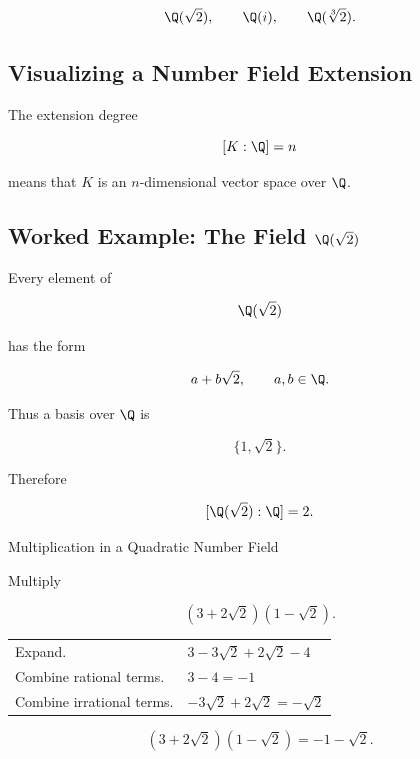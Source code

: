 \[ \Q(\sqrt2),\qquad\Q(i),\qquad\Q(\sqrt[3]{2}). \]

\subsection{Visualizing a Number Field Extension}
\label{subsec:number-field-extension-visual}

\begin{centereddiagram}
\end{centereddiagram}

The extension degree

\[ [K:\Q]=n \]

means that \(K\) is an \(n\)-dimensional vector space over \(\Q\).

\subsection{Worked Example: The Field \(\Q(\sqrt2)\)}
\label{subsec:worked-q-sqrt2}

Every element of

\[ \Q(\sqrt2) \]

has the form

\[ a+b\sqrt2,\qquad a,b\in\Q. \]

Thus a basis over \(\Q\) is

\[ \{1,\sqrt2\}. \]

Therefore

\[ [\Q(\sqrt2):\Q]=2. \]

\begin{workedexamplebox}{Multiplication in a Quadratic Number Field}

Multiply

\[ (3+2\sqrt2)(1-\sqrt2). \]

\begin{tabularx}{\textwidth}{@{}>{\raggedright\arraybackslash}p{}X@{}}
Expand. &
\(3-3\sqrt2+2\sqrt2-4\)\\
Combine rational terms. &
\(3-4=-1\)\\
Combine irrational terms. &
\(-3\sqrt2+2\sqrt2=-\sqrt2\)
\end{tabularx}

\begin{answerbox}
\[ \boxed{(3+2\sqrt2)(1-\sqrt2)=-1-\sqrt2.} \]
\end{answerbox}
\end{workedexamplebox}


